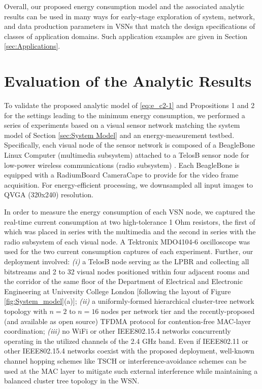 \documentclass[twocolumn,english]{IEEEtran}
\theoremstyle{plain}
\theoremstyle{definition}
\begin{document}
Overall, our proposed energy consumption model and the associated
analytic results can be used in many ways for early-stage exploration
of system, network, and data production parameters in VSNs that match
the design specifications of classes of application domains. Such
application examples are given in Section \ref{sec:Applications}.


\section{Evaluation of the Analytic Results\label{sec:Evaluation-of-Energy} }

To validate the proposed analytic model of \eqref{eq:e_c2-1} and
Propositions 1 and 2 for the settings leading to the minimum energy
consumption, we performed a series of experiments based on a visual
sensor network matching the system model of Section \ref{sec:System Model}
and an energy-measurement testbed. Specifically, each visual node
of the sensor network is composed of a BeagleBone Linux Computer (multimedia
subsystem) attached to a TelosB sensor node for low-power wireless
communications (radio subsystem) \cite{CancliniSENSYS2013}. Each
BeagleBone is equipped with a RadiumBoard CameraCape to provide for
the video frame acquisition. For energy-efficient processing, we downsampled
all input images to QVGA (320x240) resolution. 

In order to measure the energy consumption of each VSN node, we captured
the real-time current consumption at two high-tolerance 1 Ohm resistors,
the first of which was placed in series with the multimedia and the
second in series with the radio subsystem of each visual node. A Tektronix
MDO4104-6 oscilloscope was used for the two current consumption captures
of each experiment. Further, our deployment involved: \emph{(i)} a
TelosB node serving as the LPBR and collecting all bitstreams and
2 to 32 visual nodes positioned within four adjacent rooms and the
corridor of the same floor of the Department of Electrical and Electronic
Engineering at University College London {[}following the layout of
Figure \ref{fig:System_model}(a){]}; \emph{(ii)} a uniformly-formed
hierarchical cluster-tree network topology with $n=2$ to $n=16$
nodes per network tier and the recently-proposed (and available as
open source) TFDMA protocol \cite{burana2012DTFDMA} for contention-free
MAC-layer coordination; \emph{(iii)} no WiFi or other IEEE802.15.4
networks concurrently operating in the utilized channels of the 2.4
GHz band. Even if IEEE802.11 or other IEEE802.15.4 networks coexist
with the proposed deployment, well-known channel hopping schemes like
TSCH \cite{6185525} or interference-avoidance schemes \cite{5672592}
can be used at the MAC layer to mitigate such external interference
while maintaining a balanced cluster tree topology in the WSN. 
\end{document}
